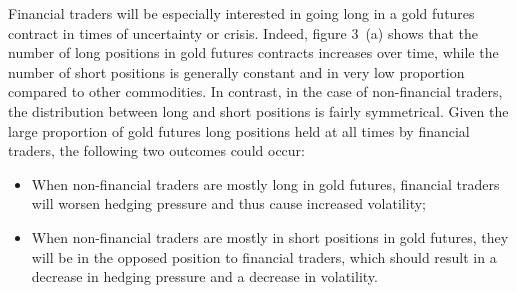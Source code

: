 \documentclass[12pt]{article}
\begin{document}
Financial traders will be especially interested in going long in a gold futures contract in times of uncertainty or crisis. Indeed, figure 3~(a) shows that the number of long positions in gold futures contracts increases over time, while the number of short positions is generally constant and in very low proportion compared to other commodities. In contrast, in the case of non-financial traders, the distribution between long and short positions is fairly symmetrical. Given the large proportion of gold futures long positions held at all times by financial traders, the following two outcomes could occur:

\begin{itemize}
\item When non-financial traders are mostly long in  gold futures, financial traders will worsen  hedging pressure  and thus cause increased volatility;
\item When non-financial traders are mostly in short positions in gold futures, they will be in the opposed position to financial traders, which should result in a decrease in hedging pressure and a decrease in volatility.
\end{itemize}
\end{document}
